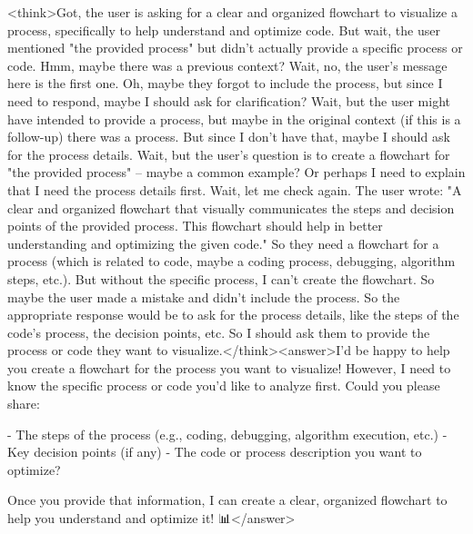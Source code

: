 <think>Got, the user is asking for a clear and organized flowchart to visualize a process, specifically to help understand and optimize code. But wait, the user mentioned "the provided process" but didn't actually provide a specific process or code. Hmm, maybe there was a previous context? Wait, no, the user's message here is the first one. Oh, maybe they forgot to include the process, but since I need to respond, maybe I should ask for clarification? Wait, but the user might have intended to provide a process, but maybe in the original context (if this is a follow-up) there was a process. But since I don't have that, maybe I should ask for the process details. Wait, but the user's question is to create a flowchart for "the provided process" – maybe a common example? Or perhaps I need to explain that I need the process details first. Wait, let me check again. The user wrote: "A clear and organized flowchart that visually communicates the steps and decision points of the provided process. This flowchart should help in better understanding and optimizing the given code." So they need a flowchart for a process (which is related to code, maybe a coding process, debugging, algorithm steps, etc.). But without the specific process, I can't create the flowchart. So maybe the user made a mistake and didn't include the process. So the appropriate response would be to ask for the process details, like the steps of the code's process, the decision points, etc. So I should ask them to provide the process or code they want to visualize.</think><answer>I’d be happy to help you create a flowchart for the process you want to visualize! However, I need to know the specific process or code you’d like to analyze first. Could you please share:  

- The steps of the process (e.g., coding, debugging, algorithm execution, etc.)  
- Key decision points (if any)  
- The code or process description you want to optimize?  

Once you provide that information, I can create a clear, organized flowchart to help you understand and optimize it! 📊</answer>